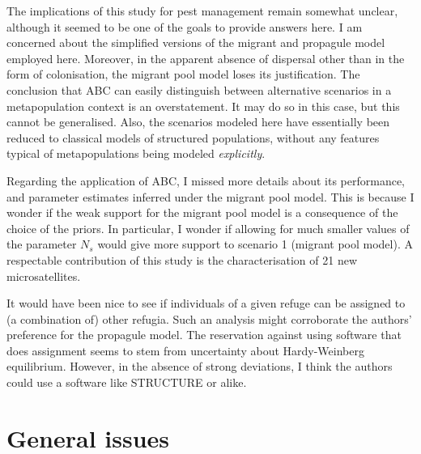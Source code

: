 \documentclass[11pt]{article}
\begin{document}
The implications of this study for pest management remain somewhat unclear, although it seemed to be one of the goals to provide answers here. I am concerned about the simplified versions of the migrant and propagule model employed here. Moreover, in the apparent absence of dispersal other than in the form of colonisation, the migrant pool model loses its justification. The conclusion that ABC can easily distinguish between alternative scenarios in a metapopulation context is an overstatement. It may do so in this case, but this cannot be generalised. Also, the scenarios modeled here have essentially been reduced to classical models of structured populations, without any features typical of metapopulations being modeled \emph{explicitly}.

Regarding the application of ABC, I missed more details about its performance, and parameter estimates inferred under the migrant pool model. This is because I wonder if the weak support for the migrant pool model is a consequence of the choice of the priors. In particular, I wonder if allowing for much smaller values of the parameter $N_s$ would give more support to scenario 1 (migrant pool model). A respectable contribution of this study is the characterisation of 21 new microsatellites.

It would have been nice to see if individuals of a given refuge can be assigned to (a combination of) other refugia. Such an analysis might corroborate the authors' preference for the propagule model. The reservation against using software that does assignment seems to stem from uncertainty about Hardy-Weinberg equilibrium. However, in the absence of strong deviations, I think the authors could use a software like STRUCTURE or alike.

\section{General issues}
\end{document}
